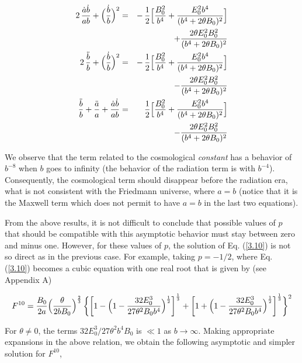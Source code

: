 \documentclass[a4paper,twocolumn,prd,superscriptaddress,nofootinbib,showpacs]
{revtex4}
\begin{document}
\begin{eqnarray}
2\,\frac{\dot a\dot b}{ab}
+\Bigl(\frac{\dot b}{b}\Bigr)^2
&=&-\,\frac{1}{2}\Bigl[\frac{B_0^2}{b^4}
+\frac{E_0^2b^4}{(b^4+2\theta B_0)^2}\Bigr]
\nonumber\\
&&+\frac{2\theta E_0^2B_0^2}{(b^4+2\theta B_0)^2}
\label{4.2}\\
2\,\frac{\ddot b}{b}
+\Bigl(\frac{\dot b}{b}\Bigr)^2
&=&-\,\frac{1}{2}\Bigl[\frac{B_0^2}{b^4}
+\frac{E_0^2b^4}{(b^4+2\theta B_0)^2}\Bigr]
\nonumber\\
&&-\frac{2\theta E_0^2B_0^2}{(b^4+2\theta B_0)^2}
\label{4.3}\\
\frac{\ddot b}{b}+\frac{\ddot a}{a}+\frac{\dot a\dot b}{ab}
&=&\frac{1}{2}\Bigl[\frac{B_0^2}{b^4}
+\frac{E_0^2b^4}{(b^4+2\theta B_0)^2}\Bigr]
\nonumber\\
&&-\frac{2\theta E_0^2B_0^2}{(b^4+2\theta B_0)^2}
\label{4.4}
\end{eqnarray}

\noindent
We observe that the term related to the cosmological {\it constant}
has a behavior of $b^{-8}$ when $b$ goes to infinity (the behavior of
the radiation term is with $b^{-4}$). Consequently, the cosmological
term should disappear before the radiation era, what is not consistent
with the Friedmann universe, where $a=b$ (notice that it is the
Maxwell term which does not permit to have $a=b$ in the last two
equations).

\medskip
From the above results, it is not difficult to conclude that possible
values of $p$ that should be compatible with this asymptotic behavior
must stay between zero and minus one. However, for these values of
$p$, the solution of Eq. (\ref{3.10}) is not so direct as in the
previous case. For example, taking $p=-1/2$, where Eq. (\ref{3.10})
becomes a cubic equation with one real root that is given by (see
Appendix A)

\begin{widetext}

\begin{equation}
F^{10}=\frac{B_0}{2a}\Bigl(\frac{\theta}{2bB_0}\Bigr)^\frac{2}{3}\,
\biggl\{\biggl[1-\Bigl(1-\frac{32E_0^3}{27\theta^2B_0b^4}\Bigr)
^\frac{1}{2}
\biggr]^\frac{1}{3}
+\biggl[1+\Bigl(1-\frac{32E_0^3}{27\theta^2B_0b^4}\Bigr)^\frac{1}{2}
\biggr]^\frac{1}{3}\biggr\}^2
\label{4.5}
\end{equation}

\end{widetext}

\noindent
For $\theta\neq0$, the terms $32E_0^3/27\theta^2b^4B_0$ is $\ll1 $ as
$b\rightarrow\infty$. Making appropriate expansions in the above
relation, we obtain the following asymptotic and simpler solution for
$F^{10}$,
\end{document}

